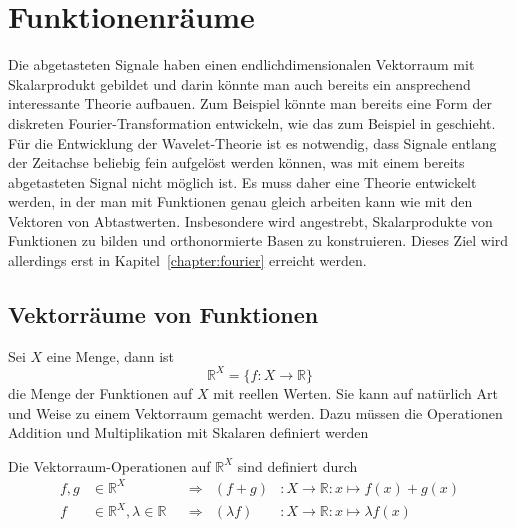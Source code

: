 %
%
%
\section{Funktionenräume%
\label{section:funktionenraume}}
Die abgetasteten Signale haben einen endlichdimensionalen Vektorraum
mit Skalarprodukt gebildet und darin könnte man auch bereits ein
ansprechend interessante Theorie aufbauen.
Zum Beispiel könnte man bereits eine Form der diskreten
Fourier-Transformation entwickeln, wie das zum Beispiel in
\cite{buch:mathsem-klima} geschieht.
Für die Entwicklung der Wavelet-Theorie ist es notwendig, dass Signale
entlang der Zeitachse beliebig fein aufgelöst werden können, was
mit einem bereits abgetasteten Signal nicht möglich ist.
Es muss daher eine Theorie entwickelt werden, in der man mit
Funktionen genau gleich arbeiten kann wie mit den Vektoren von
Abtastwerten.
Insbesondere wird angestrebt, Skalarprodukte von Funktionen
zu bilden und orthonormierte Basen zu konstruieren. 
Dieses Ziel wird allerdings erst in Kapitel~\ref{chapter:fourier} erreicht werden.

\subsection{Vektorräume von Funktionen}
Sei $X$ eine Menge, dann ist
\[
\mathbb R^X = \{ f\colon X\to\mathbb R\}
\]
die Menge der Funktionen auf $X$ mit reellen Werten.
Sie kann auf natürlich Art und Weise zu einem Vektorraum gemacht werden.
Dazu müssen die Operationen Addition und Multiplikation mit Skalaren
definiert werden

\begin{definition}
Die Vektorraum-Operationen auf $\mathbb R^X$ sind definiert durch
\[
\begin{aligned}
f,g&\in \mathbb R^X
	&&\Rightarrow
	&(f+g)&\colon X\to\mathbb R:x\mapsto f(x)+g(x)
\\
f&\in\mathbb R^X, \lambda\in\mathbb R
	&&\Rightarrow
	&(\lambda f)&\colon X\to\mathbb R:x\mapsto \lambda f(x)
\end{aligned}
\]
\end{definition}

